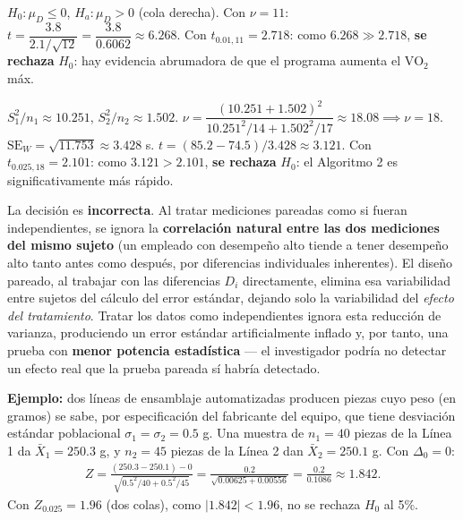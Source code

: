 \begin{solproblema}[prob:b0c0618]
	$H_0:\mu_D\le0$, $H_a:\mu_D>0$ (cola derecha). Con $\nu=11$: $t = \dfrac{3.8}{2.1/\sqrt{12}} = \dfrac{3.8}{0.6062}\approx6.268$. Con $t_{0.01,11}=2.718$: como $6.268\gg2.718$, \textbf{se rechaza} $H_0$: hay evidencia abrumadora de que el programa aumenta el $\text{VO}_2$ máx.
\end{solproblema}

\begin{solproblema}[prob:f2e4336]
	$S_1^2/n_1\approx10.251$, $S_2^2/n_2\approx1.502$. $\nu = \dfrac{(10.251+1.502)^2}{10.251^2/14+1.502^2/17}\approx18.08\implies\nu=18$. $\text{SE}_W=\sqrt{11.753}\approx3.428$ s. $t=(85.2-74.5)/3.428\approx3.121$. Con $t_{0.025,18}=2.101$: como $3.121>2.101$, \textbf{se rechaza} $H_0$: el Algoritmo 2 es significativamente más rápido.
\end{solproblema}

\begin{solproblema}[prob:bf23a02]
	La decisión es \textbf{incorrecta}. Al tratar mediciones pareadas como si fueran independientes, se ignora la \textbf{correlación natural entre las dos mediciones del mismo sujeto} (un empleado con desempeño alto tiende a tener desempeño alto tanto antes como después, por diferencias individuales inherentes). El diseño pareado, al trabajar con las diferencias $D_i$ directamente, elimina esa variabilidad entre sujetos del cálculo del error estándar, dejando solo la variabilidad del \emph{efecto del tratamiento}. Tratar los datos como independientes ignora esta reducción de varianza, produciendo un error estándar artificialmente inflado y, por tanto, una prueba con \textbf{menor potencia estadística} — el investigador podría no detectar un efecto real que la prueba pareada sí habría detectado.
\end{solproblema}

\begin{solproblema}[prob:7fe0aa3]
	\textbf{Ejemplo:} dos líneas de ensamblaje automatizadas producen piezas cuyo peso (en gramos) se sabe, por especificación del fabricante del equipo, que tiene desviación estándar poblacional $\sigma_1=\sigma_2=0.5$ g. Una muestra de $n_1=40$ piezas de la Línea 1 da $\bar X_1=250.3$ g, y $n_2=45$ piezas de la Línea 2 dan $\bar X_2=250.1$ g. Con $\Delta_0=0$:
	\begin{align*}
		Z = \frac{(250.3-250.1)-0}{\sqrt{0.5^2/40+0.5^2/45}} = \frac{0.2}{\sqrt{0.00625+0.00556}} = \frac{0.2}{0.1086} \approx1.842.
	\end{align*}
	Con $Z_{0.025}=1.96$ (dos colas), como $|1.842|<1.96$, no se rechaza $H_0$ al 5\%.
\end{solproblema}
